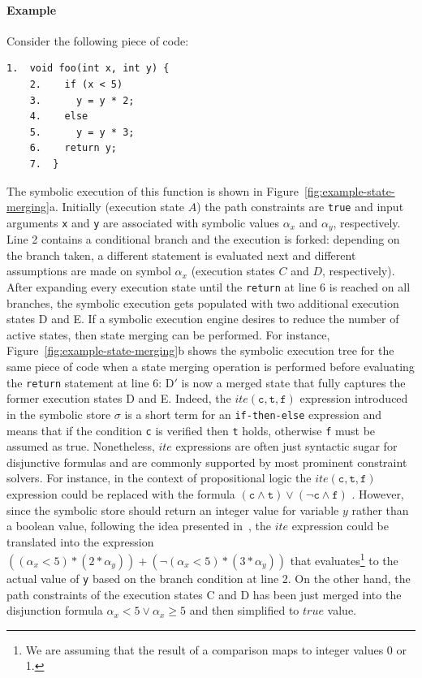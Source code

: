 \paragraph{Example} Consider the following piece of code:
    \begin{lstlisting}[basicstyle=\ttfamily\small]
    1.  void foo(int x, int y) {
    2.    if (x < 5)
    3.      y = y * 2;
    4.    else
    5.      y = y * 3;
    6.    return y;
    7.  }
    \end{lstlisting}
The symbolic execution of this function is shown in Figure~\ref{fig:example-state-merging}a. Initially (execution state $A$) the path constraints are {\tt true} and input arguments {\tt x} and {\tt y} are associated with symbolic values $\alpha_x$ and $\alpha_y$, respectively. Line 2 contains a conditional branch and the execution is forked: depending on the branch taken, a different statement is evaluated next and different assumptions are made on symbol $\alpha_x$ (execution states $C$ and $D$, respectively). After expanding every execution state until the {\tt return} at line 6 is reached on all branches, the symbolic execution gets populated with two additional execution states D and E. If a symbolic execution engine desires to reduce the number of active states, then state merging can be performed. For instance, Figure~\ref{fig:example-state-merging}b shows the symbolic execution tree for the same piece of code when a state merging operation is performed before evaluating the {\tt return} statement at line 6: D$'$ is now a merged state that fully captures the former execution states D and E. Indeed, the $ite(\texttt{c}, \texttt{t}, \texttt{f})$ expression introduced in the symbolic store $\sigma$ is a short term for an {\tt if-then-else} expression and means that if the condition {\tt c} is verified then {\tt t} holds, otherwise {\tt f} must be assumed as true. Nonetheless, $ite$ expressions are often just syntactic sugar for disjunctive formulas and are commonly supported by most prominent constraint solvers. For instance, in the context of propositional logic the $ite(\texttt{c}, \texttt{t}, \texttt{f})$  expression could be replaced with the formula $(\texttt{c} \wedge \texttt{t}) \vee (\neg\texttt{c} \wedge \texttt{f})$ . However, since the symbolic store should return an integer value for variable $y$ rather than a boolean value, following the idea presented in~\cite{KP-PP05}, the $ite$ expression could be translated into the expression $((\alpha_x < 5) * (2 * \alpha_y)) + (\neg(\alpha_x < 5) * (3 * \alpha_y))$ that evaluates\footnote{We are assuming that the result of a comparison maps to integer values 0 or 1.} to the actual value of {\tt y} based on the branch condition at line 2. On the other hand, the path constraints of the execution states C and D has been just merged into the disjunction formula $\alpha_x < 5 \vee \alpha_x \geq 5$ and then simplified to $true$ value.

